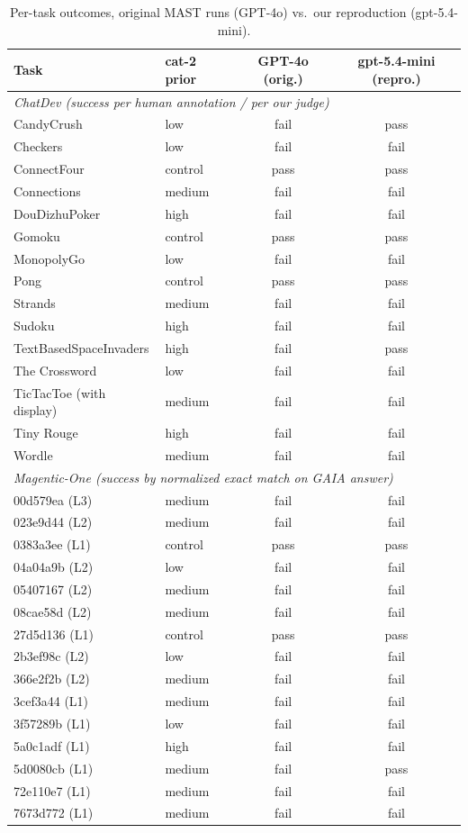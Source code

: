 \begin{table}[h]\centering\small
\begin{tabular}{llcc}\toprule
Task & cat-2 prior & GPT-4o (orig.) & gpt-5.4-mini (repro.)\\
\midrule
\multicolumn{4}{l}{\textit{ChatDev (success per human annotation / per our judge)}}\\
CandyCrush & low & fail & pass\\
Checkers & low & fail & fail\\
ConnectFour & control & pass & pass\\
Connections & medium & fail & fail\\
DouDizhuPoker & high & fail & fail\\
Gomoku & control & pass & pass\\
MonopolyGo & low & fail & fail\\
Pong & control & pass & pass\\
Strands & medium & fail & fail\\
Sudoku & high & fail & fail\\
TextBasedSpaceInvaders & high & fail & pass\\
The Crossword & low & fail & fail\\
TicTacToe (with display) & medium & fail & fail\\
Tiny Rouge & high & fail & fail\\
Wordle & medium & fail & fail\\
\midrule
\multicolumn{4}{l}{\textit{Magentic-One (success by normalized exact match on GAIA answer)}}\\
00d579ea (L3) & medium & fail & fail\\
023e9d44 (L2) & medium & fail & fail\\
0383a3ee (L1) & control & pass & pass\\
04a04a9b (L2) & low & fail & fail\\
05407167 (L2) & medium & fail & fail\\
08cae58d (L2) & medium & fail & fail\\
27d5d136 (L1) & control & pass & pass\\
2b3ef98c (L2) & low & fail & fail\\
366e2f2b (L2) & medium & fail & fail\\
3cef3a44 (L1) & medium & fail & fail\\
3f57289b (L1) & low & fail & fail\\
5a0c1adf (L1) & high & fail & fail\\
5d0080cb (L1) & medium & fail & pass\\
72e110e7 (L1) & medium & fail & fail\\
7673d772 (L1) & medium & fail & fail\\
\bottomrule\end{tabular}
\caption{Per-task outcomes, original MAST runs (GPT-4o) vs.\ our reproduction (gpt-5.4-mini).}\label{tab:outcomes}
\end{table}

